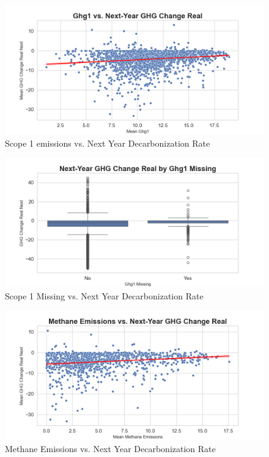 \begin{figure}[H]
\centering
    \includegraphics[width=\textwidth]{figures/ghg1_vs_ghg_change_real_next.png}
\caption{Scope 1 emissions vs. Next Year Decarbonization Rate}
\label{fig:ghg1_vs_ghg_change_real_next}
\end{figure}

\begin{figure}[H]
\centering
  \includegraphics[width=\textwidth]{figures/ghg_change_real_next_by_ghg1_na.png}
\caption{Scope 1 Missing vs. Next Year Decarbonization Rate}
\label{fig:ghg_change_real_next_by_ghg1_na}
\end{figure}

\begin{figure}[H]
\centering
  \includegraphics[width=\textwidth]{figures/methane_emissions_vs_ghg_change_real_next.png}
\caption{Methane Emissions vs. Next Year Decarbonization Rate}
\label{fig:methane_emissions_vs_ghg_change_real_next}
\end{figure}

